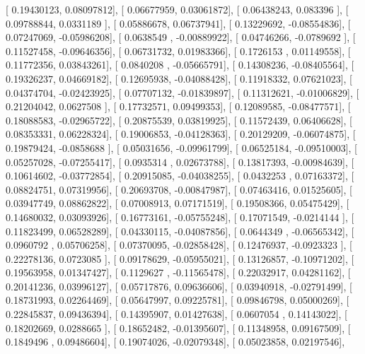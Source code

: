 \documentclass{article}
\begin{document}
       [ 0.19430123,  0.08097812],
       [ 0.06677959,  0.03061872],
       [ 0.06438243,  0.083396  ],
       [ 0.09788844,  0.0331189 ],
       [ 0.05886678,  0.06737941],
       [ 0.13229692, -0.08554836],
       [ 0.07247069, -0.05986208],
       [ 0.0638549 , -0.00889922],
       [ 0.04746266, -0.0789692 ],
       [ 0.11527458, -0.09646356],
       [ 0.06731732,  0.01983366],
       [ 0.1726153 ,  0.01149558],
       [ 0.11772356,  0.03843261],
       [ 0.0840208 , -0.05665791],
       [ 0.14308236, -0.08405564],
       [ 0.19326237,  0.04669182],
       [ 0.12695938, -0.04088428],
       [ 0.11918332,  0.07621023],
       [ 0.04374704, -0.02423925],
       [ 0.07707132, -0.01839897],
       [ 0.11312621, -0.01006829],
       [ 0.21204042,  0.0627508 ],
       [ 0.17732571,  0.09499353],
       [ 0.12089585, -0.08477571],
       [ 0.18088583, -0.02965722],
       [ 0.20875539,  0.03819925],
       [ 0.11572439,  0.06406628],
       [ 0.08353331,  0.06228324],
       [ 0.19006853, -0.04128363],
       [ 0.20129209, -0.06074875],
       [ 0.19879424, -0.0858688 ],
       [ 0.05031656, -0.09961799],
       [ 0.06525184, -0.09510003],
       [ 0.05257028, -0.07255417],
       [ 0.0935314 ,  0.02673788],
       [ 0.13817393, -0.00984639],
       [ 0.10614602, -0.03772854],
       [ 0.20915085, -0.04038255],
       [ 0.0432253 ,  0.07163372],
       [ 0.08824751,  0.07319956],
       [ 0.20693708, -0.00847987],
       [ 0.07463416,  0.01525605],
       [ 0.03947749,  0.08862822],
       [ 0.07008913,  0.07171519],
       [ 0.19508366,  0.05475429],
       [ 0.14680032,  0.03093926],
       [ 0.16773161, -0.05755248],
       [ 0.17071549, -0.0214144 ],
       [ 0.11823499,  0.06528289],
       [ 0.04330115, -0.04087856],
       [ 0.0644349 , -0.06565342],
       [ 0.0960792 ,  0.05706258],
       [ 0.07370095, -0.02858428],
       [ 0.12476937, -0.0923323 ],
       [ 0.22278136,  0.0723085 ],
       [ 0.09178629, -0.05955021],
       [ 0.13126857, -0.10971202],
       [ 0.19563958,  0.01347427],
       [ 0.1129627 , -0.11565478],
       [ 0.22032917,  0.04281162],
       [ 0.20141236,  0.03996127],
       [ 0.05717876,  0.09636606],
       [ 0.03940918, -0.02791499],
       [ 0.18731993,  0.02264469],
       [ 0.05647997,  0.09225781],
       [ 0.09846798,  0.05000269],
       [ 0.22845837,  0.09436394],
       [ 0.14395907,  0.01427638],
       [ 0.0607054 ,  0.14143022],
       [ 0.18202669,  0.0288665 ],
       [ 0.18652482, -0.01395607],
       [ 0.11348958,  0.09167509],
       [ 0.1849496 ,  0.09486604],
       [ 0.19074026, -0.02079348],
       [ 0.05023858,  0.02197546],
\end{document}
